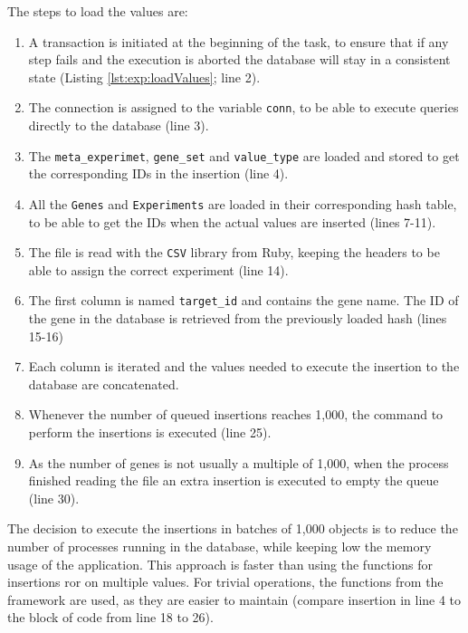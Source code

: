 The steps to load the values are:
\begin{enumerate}
\item A transaction is initiated at the beginning of the task, to ensure that if any step fails and the execution is aborted the database will stay in a consistent state (Listing \ref{lst:exp:loadValues}; line 2).
\item The connection is assigned to the variable \verb|conn|, to be able to execute queries directly to the database (line 3).   
\item The \verb|meta_experimet|, \verb|gene_set| and \verb|value_type| are loaded and stored to get the corresponding IDs in the insertion (line 4).
\item All the \verb|Genes| and \verb|Experiments| are loaded in their corresponding hash table, to be able to get the IDs when the actual values are inserted (lines 7-11). 
\item The file is read with the \verb|CSV| library from Ruby, keeping the headers to be able to assign the correct experiment (line 14). 
\item The first column is named \verb|target_id| and contains the gene name. The ID of the gene  in the database is retrieved from the previously loaded hash (lines 15-16)
\item Each column is iterated and the values needed to execute the insertion to the database are concatenated. 
\item Whenever the number of queued insertions reaches 1,000, the command to perform the insertions is executed (line 25). 
\item As the number of genes is not usually a multiple of 1,000, when the process finished reading the file an extra insertion is executed to empty the queue (line 30).
\end{enumerate}

The decision to execute the insertions in batches of 1,000 objects is to reduce the number of processes running in the database, while keeping low the memory usage of the application. 
This approach is faster than using the functions for insertions \acrshort{ror} on multiple values. 
For trivial operations, the functions from the framework are used, as they are easier to maintain (compare insertion in line 4 to the block of code from line 18 to 26). 

